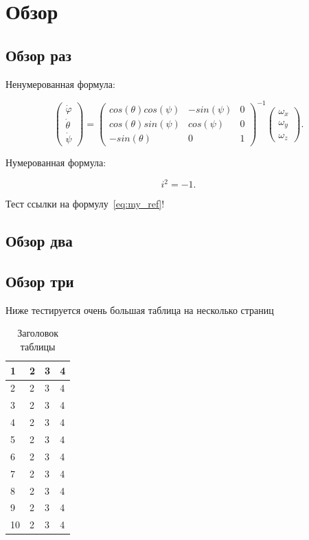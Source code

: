 \documentclass[a4paper,article,14pt]{extarticle}
\begin{document}
\section{Обзор}
\subsection{Обзор раз}
Ненумерованная формула:

\begin{equation}
    \begin{pmatrix} \dot{\varphi}\\ \dot{\theta} \\ \dot{\psi} \end{pmatrix}
    = \begin{pmatrix}
        cos(\theta)cos(\psi) & -sin(\psi) & 0 \\
        cos(\theta)sin(\psi) & cos(\psi)  & 0 \\
        -sin(\theta)         & 0         &  1
    \end{pmatrix}^{-1}
    \begin{pmatrix} \omega_x\\ \omega_y \\ \omega_z \end{pmatrix}.
\end{equation}

Нумерованная формула:

\begin{equation} \label{eq:my_ref}
    i^2 = -1.
\end{equation}

Тест ссылки на формулу~\ref{eq:my_ref}!

\subsection{Обзор два}

\subsection{Обзор три}
Ниже тестируется очень большая таблица на несколько страниц

\begin{center}
    \begin{longtable}{|p{2cm}|p{3cm}|p{7cm}|p{3cm}|}
    \caption{Заголовок таблицы}\\
    \hline
    1 & 2 & 3 & 4\\
    \hline
    2 & 2 & 3 & 4\\
    \hline
    3 & 2 & 3 & 4\\
    \hline
    4 & 2 & 3 & 4\\
    \hline
    5 & 2 & 3 & 4\\
    \hline
    6 & 2 & 3 & 4\\
    \hline
    7 & 2 & 3 & 4\\
    \hline
    8 & 2 & 3 & 4\\
    \hline
    9 & 2 & 3 & 4\\
    \hline
    10 & 2 & 3 & 4\\
    \hline


    \end{longtable}
\end{center}
\end{document}
